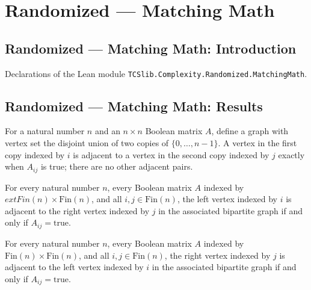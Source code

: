 \section{Randomized --- Matching Math}
\subsection*{Randomized --- Matching Math: Introduction}

Declarations of the Lean module \texttt{TCSlib.Complexity.Randomized.MatchingMath}.

\subsection*{Randomized --- Matching Math: Results}

\begin{definition}
\label{Randomized.Matching.bipartiteGraph}
\leanok
For a natural number $n$ and an $n\times n$ Boolean matrix $A$, define a graph with
vertex set the disjoint union of two copies of $\{0,\ldots,n-1\}$. A vertex in the first
copy indexed by $i$ is adjacent to a vertex in the second copy indexed by $j$ exactly
when $A_{ij}$ is true; there are no other adjacent pairs.
\end{definition}

\begin{theorem}
\label{Randomized.Matching.bipartiteGraph_adj_inl_inr}
\leanok
{}
For every natural number $n$, every Boolean matrix $A$ indexed by $	ext{Fin}(n) \times
\text{Fin}(n)$, and all $i,j \in \text{Fin}(n)$, the left vertex indexed by $i$ is
adjacent to the right vertex indexed by $j$ in the associated bipartite graph if and
only if $A_{ij}=\text{true}$.
\end{theorem}

\begin{theorem}
\label{Randomized.Matching.bipartiteGraph_adj_inr_inl}
\leanok
{}
For every natural number $n$, every Boolean matrix $A$ indexed by $\text{Fin}(n) \times
\text{Fin}(n)$, and all $i,j \in \text{Fin}(n)$, the right vertex indexed by $j$ is
adjacent to the left vertex indexed by $i$ in the associated bipartite graph if and only
if $A_{ij}=\text{true}$.
\end{theorem}

